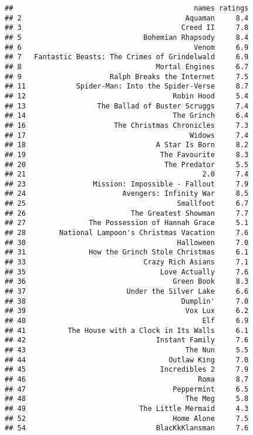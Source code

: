\documentclass[]{article}
\begin{document}
\begin{verbatim}
##                                           names ratings
## 2                                       Aquaman     8.4
## 3                                      Creed II     7.8
## 5                             Bohemian Rhapsody     8.4
## 6                                         Venom     6.9
## 7   Fantastic Beasts: The Crimes of Grindelwald     6.9
## 8                                Mortal Engines     6.7
## 9                     Ralph Breaks the Internet     7.5
## 11            Spider-Man: Into the Spider-Verse     8.7
## 12                                   Robin Hood     5.4
## 13                 The Ballad of Buster Scruggs     7.4
## 14                                   The Grinch     6.4
## 16                     The Christmas Chronicles     7.3
## 17                                       Widows     7.4
## 18                               A Star Is Born     8.2
## 19                                The Favourite     8.3
## 20                                 The Predator     5.5
## 21                                          2.0     7.4
## 23                Mission: Impossible - Fallout     7.9
## 24                       Avengers: Infinity War     8.5
## 25                                    Smallfoot     6.7
## 26                         The Greatest Showman     7.7
## 27               The Possession of Hannah Grace     5.1
## 28        National Lampoon's Christmas Vacation     7.6
## 30                                    Halloween     7.0
## 31               How the Grinch Stole Christmas     6.1
## 33                            Crazy Rich Asians     7.1
## 35                                Love Actually     7.6
## 36                                   Green Book     8.3
## 37                        Under the Silver Lake     6.6
## 38                                     Dumplin'     7.0
## 39                                      Vox Lux     6.2
## 40                                          Elf     6.9
## 41          The House with a Clock in Its Walls     6.1
## 42                               Instant Family     7.6
## 43                                      The Nun     5.5
## 44                                  Outlaw King     7.0
## 45                                Incredibles 2     7.9
## 46                                         Roma     8.7
## 47                                   Peppermint     6.5
## 48                                      The Meg     5.8
## 49                           The Little Mermaid     4.3
## 52                                   Home Alone     7.5
## 54                               BlacKkKlansman     7.6

\end{verbatim}
\end{document}
